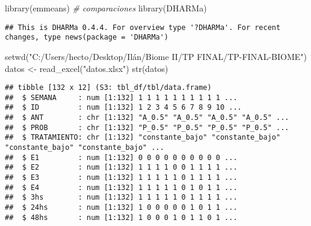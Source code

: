 \documentclass[
]{article}
\newenvironment{Shaded}{\begin{snugshade}}{\end{snugshade}}
\newcommand{\CommentTok}[1]{\textcolor[rgb]{0.56,0.35,0.01}{\textit{#1}}}
\newcommand{\FunctionTok}[1]{\textcolor[rgb]{0.00,0.00,0.00}{#1}}
\newcommand{\NormalTok}[1]{#1}
\newcommand{\OtherTok}[1]{\textcolor[rgb]{0.56,0.35,0.01}{#1}}
\newcommand{\SpecialCharTok}[1]{\textcolor[rgb]{0.00,0.00,0.00}{#1}}
\newcommand{\StringTok}[1]{\textcolor[rgb]{0.31,0.60,0.02}{#1}}
\begin{document}
\begin{Shaded}
\begin{Highlighting}[]
\FunctionTok{library}\NormalTok{(emmeans)   }\CommentTok{\# comparaciones}
\FunctionTok{library}\NormalTok{(DHARMa)}
\end{Highlighting}
\end{Shaded}

\begin{verbatim}
## This is DHARMa 0.4.4. For overview type '?DHARMa'. For recent changes, type news(package = 'DHARMa')
\end{verbatim}

\begin{Shaded}
\begin{Highlighting}[]
\FunctionTok{setwd}\NormalTok{(}\StringTok{"C:/Users/hecto/Desktop/Ilán/Biome II/TP FINAL/TP{-}FINAL{-}BIOME"}\NormalTok{)}
\NormalTok{datos }\OtherTok{\textless{}{-}} \FunctionTok{read\_excel}\NormalTok{(}\StringTok{"datos.xlsx"}\NormalTok{)}
\FunctionTok{str}\NormalTok{(datos)}
\end{Highlighting}
\end{Shaded}

\begin{verbatim}
## tibble [132 x 12] (S3: tbl_df/tbl/data.frame)
##  $ SEMANA     : num [1:132] 1 1 1 1 1 1 1 1 1 1 ...
##  $ ID         : num [1:132] 1 2 3 4 5 6 7 8 9 10 ...
##  $ ANT        : chr [1:132] "A_0.5" "A_0.5" "A_0.5" "A_0.5" ...
##  $ PROB       : chr [1:132] "P_0.5" "P_0.5" "P_0.5" "P_0.5" ...
##  $ TRATAMIENTO: chr [1:132] "constante_bajo" "constante_bajo" "constante_bajo" "constante_bajo" ...
##  $ E1         : num [1:132] 0 0 0 0 0 0 0 0 0 0 ...
##  $ E2         : num [1:132] 1 1 1 1 0 0 1 1 1 1 ...
##  $ E3         : num [1:132] 1 1 1 1 1 0 1 1 1 1 ...
##  $ E4         : num [1:132] 1 1 1 1 1 0 1 0 1 1 ...
##  $ 3hs        : num [1:132] 1 1 1 1 1 0 1 1 1 1 ...
##  $ 24hs       : num [1:132] 1 0 0 0 0 0 1 0 1 1 ...
##  $ 48hs       : num [1:132] 1 0 0 0 1 0 1 1 0 1 ...
\end{verbatim}

\begin{Shaded}
\end{Shaded}
\end{document}

